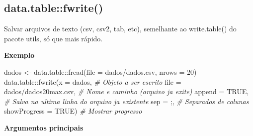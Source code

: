 \documentclass[
]{book}
\newenvironment{Shaded}{\begin{snugshade}}{\end{snugshade}}
\newcommand{\AttributeTok}[1]{\textcolor[rgb]{0.77,0.63,0.00}{#1}}
\newcommand{\CommentTok}[1]{\textcolor[rgb]{0.56,0.35,0.01}{\textit{#1}}}
\newcommand{\ConstantTok}[1]{\textcolor[rgb]{0.00,0.00,0.00}{#1}}
\newcommand{\DecValTok}[1]{\textcolor[rgb]{0.00,0.00,0.81}{#1}}
\newcommand{\FunctionTok}[1]{\textcolor[rgb]{0.00,0.00,0.00}{#1}}
\newcommand{\NormalTok}[1]{#1}
\newcommand{\OtherTok}[1]{\textcolor[rgb]{0.56,0.35,0.01}{#1}}
\newcommand{\SpecialCharTok}[1]{\textcolor[rgb]{0.00,0.00,0.00}{#1}}
\newcommand{\StringTok}[1]{\textcolor[rgb]{0.31,0.60,0.02}{#1}}
\theoremstyle{definition}
\theoremstyle{definition}
\theoremstyle{definition}
\theoremstyle{definition}
\theoremstyle{remark}
\begin{document}
\hypertarget{data.tablefwrite}{%
\subsection{data.table::fwrite()}\label{data.tablefwrite}}

Salvar arquivos de texto (csv, csv2, tab, etc), semelhante ao write.table() do pacote utils, só que mais rápido.

\textbf{Exemplo}

\begin{Shaded}
\begin{Highlighting}[]
\NormalTok{dados }\OtherTok{\textless{}{-}}\NormalTok{ data.table}\SpecialCharTok{::}\FunctionTok{fread}\NormalTok{(}\AttributeTok{file =} \StringTok{\textquotesingle{}dados/dados.csv\textquotesingle{}}\NormalTok{, }\AttributeTok{nrows =} \DecValTok{20}\NormalTok{)}
\NormalTok{data.table}\SpecialCharTok{::}\FunctionTok{fwrite}\NormalTok{(}\AttributeTok{x =}\NormalTok{ dados,                     }\CommentTok{\# Objeto a ser escrito}
                   \AttributeTok{file =} \StringTok{\textquotesingle{}dados/dados20max.csv\textquotesingle{}}\NormalTok{, }\CommentTok{\# Nome e caminho (arquivo ja exite)}
                   \AttributeTok{append =} \ConstantTok{TRUE}\NormalTok{,                 }\CommentTok{\# Salva na ultima linha do arquivo ja existente}
                   \AttributeTok{sep =} \StringTok{\textquotesingle{};\textquotesingle{}}\NormalTok{,                     }\CommentTok{\# Separados de colunas}
                   \AttributeTok{showProgress =} \ConstantTok{TRUE}\NormalTok{)           }\CommentTok{\# Mostrar progresso}
\end{Highlighting}
\end{Shaded}

\textbf{Argumentos principais}
\end{document}
